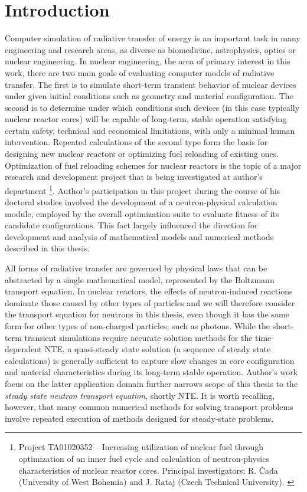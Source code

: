 \chapter{Introduction}

Computer simulation of radiative transfer of energy is an important task in many engineering and research areas, as
diverse as biomedicine, astrophysics, optics or nuclear engineering. In nuclear engineering, the area of primary
interest in this work, there are two main goals of evaluating computer models of radiative transfer. The first is
to simulate short-term transient behavior of nuclear devices under given initial conditions such as geometry and material
configuration. The second is to determine under which conditions such devices (in this case typically nuclear reactor
cores) will be capable of long-term, stable operation satisfying certain safety, technical and economical limitations,
with only a minimal human intervention. Repeated calculations of the second type form the basis for designing new
nuclear reactors or optimizing fuel reloading of existing ones. Optimization of fuel reloading schemes for nuclear
reactors is the topic of a major research and development project that is being investigated at author's department
\footnote{Project TA01020352 -- Increasing utilization of nuclear fuel through optimization of an inner fuel cycle and
calculation of neutron-physics characteristics of nuclear reactor cores. Principal investigators: R. {\v C}ada
(University of West Bohemia) and J. Rataj (Czech Technical University). \label{ftn:TACR}}.
Author's participation in this project during the course of his doctoral studies involved the development of a
neutron-physical calculation module, employed by the overall optimization suite to evaluate fitness of its candidate
configurations. This fact largely influenced the direction for development and analysis of mathematical models and
numerical methods described in this thesis.

All forms of radiative transfer are governed by physical laws that can be abstracted by a single mathematical model,
represented by the Boltzmann transport equation. In nuclear reactors, the effects of neutron-induced reactions dominate
those caused by other types of particles and we will therefore consider the transport equation for neutrons in this
thesis, even though it has the same form for other types of non-charged particles, such as photons. While the short-term
transient simulations require accurate solution methods for the time-dependent NTE, a quasi-steady state solution (a
sequence of steady state calculations) is generally sufficient to capture slow changes in core configuration and
material characteristics during its long-term stable operation.
Author's work focus on the latter application domain further narrows scope of this thesis to the \textit{steady state
neutron transport equation}, shortly NTE. It is worth recalling, however, that many common numerical methods
for solving transport problems involve repeated execution of methods designed for steady-state problems.

